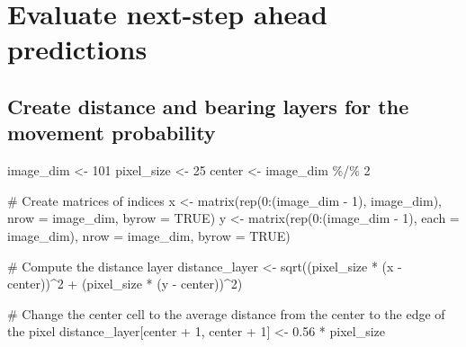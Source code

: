 \documentclass[
  letterpaper,
  DIV=11,
  numbers=noendperiod]{scrartcl}
\newenvironment{Shaded}{\begin{snugshade}}{\end{snugshade}}
\newcommand{\AttributeTok}[1]{\textcolor[rgb]{0.40,0.45,0.13}{#1}}
\newcommand{\CommentTok}[1]{\textcolor[rgb]{0.37,0.37,0.37}{#1}}
\newcommand{\ConstantTok}[1]{\textcolor[rgb]{0.56,0.35,0.01}{#1}}
\newcommand{\DecValTok}[1]{\textcolor[rgb]{0.68,0.00,0.00}{#1}}
\newcommand{\FloatTok}[1]{\textcolor[rgb]{0.68,0.00,0.00}{#1}}
\newcommand{\FunctionTok}[1]{\textcolor[rgb]{0.28,0.35,0.67}{#1}}
\newcommand{\NormalTok}[1]{\textcolor[rgb]{0.00,0.23,0.31}{#1}}
\newcommand{\OtherTok}[1]{\textcolor[rgb]{0.00,0.23,0.31}{#1}}
\newcommand{\SpecialCharTok}[1]{\textcolor[rgb]{0.37,0.37,0.37}{#1}}
\begin{document}
\section{Evaluate next-step ahead
predictions}\label{evaluate-next-step-ahead-predictions}

\subsection{Create distance and bearing layers for the movement
probability}\label{create-distance-and-bearing-layers-for-the-movement-probability}

\begin{Shaded}
\begin{Highlighting}[]
\NormalTok{image\_dim }\OtherTok{\textless{}{-}} \DecValTok{101}
\NormalTok{pixel\_size }\OtherTok{\textless{}{-}} \DecValTok{25}
\NormalTok{center }\OtherTok{\textless{}{-}}\NormalTok{ image\_dim }\SpecialCharTok{\%/\%} \DecValTok{2}

\CommentTok{\# Create matrices of indices}
\NormalTok{x }\OtherTok{\textless{}{-}} \FunctionTok{matrix}\NormalTok{(}\FunctionTok{rep}\NormalTok{(}\DecValTok{0}\SpecialCharTok{:}\NormalTok{(image\_dim }\SpecialCharTok{{-}} \DecValTok{1}\NormalTok{), image\_dim), }\AttributeTok{nrow =}\NormalTok{ image\_dim, }\AttributeTok{byrow =} \ConstantTok{TRUE}\NormalTok{)}
\NormalTok{y }\OtherTok{\textless{}{-}} \FunctionTok{matrix}\NormalTok{(}\FunctionTok{rep}\NormalTok{(}\DecValTok{0}\SpecialCharTok{:}\NormalTok{(image\_dim }\SpecialCharTok{{-}} \DecValTok{1}\NormalTok{), }\AttributeTok{each =}\NormalTok{ image\_dim), }\AttributeTok{nrow =}\NormalTok{ image\_dim, }\AttributeTok{byrow =} \ConstantTok{TRUE}\NormalTok{)}

\CommentTok{\# Compute the distance layer}
\NormalTok{distance\_layer }\OtherTok{\textless{}{-}} \FunctionTok{sqrt}\NormalTok{((pixel\_size }\SpecialCharTok{*}\NormalTok{ (x }\SpecialCharTok{{-}}\NormalTok{ center))}\SpecialCharTok{\^{}}\DecValTok{2} \SpecialCharTok{+}\NormalTok{ (pixel\_size }\SpecialCharTok{*}\NormalTok{ (y }\SpecialCharTok{{-}}\NormalTok{ center))}\SpecialCharTok{\^{}}\DecValTok{2}\NormalTok{)}

\CommentTok{\# Change the center cell to the average distance from the center to the edge of the pixel}
\NormalTok{distance\_layer[center }\SpecialCharTok{+} \DecValTok{1}\NormalTok{, center }\SpecialCharTok{+} \DecValTok{1}\NormalTok{] }\OtherTok{\textless{}{-}} \FloatTok{0.56} \SpecialCharTok{*}\NormalTok{ pixel\_size}


\end{Highlighting}
\end{Shaded}
\end{document}
